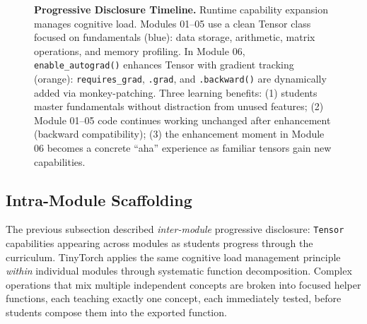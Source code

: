 \documentclass[10pt,twocolumn]{article}
\begin{document}
\begin{figure}[t]
\caption{\textbf{Progressive Disclosure Timeline.} Runtime capability expansion manages cognitive load. Modules 01--05 use a clean Tensor class focused on fundamentals (blue): data storage, arithmetic, matrix operations, and memory profiling. In Module 06, \texttt{enable\_autograd()} enhances Tensor with gradient tracking (orange): \texttt{requires\_grad}, \texttt{.grad}, and \texttt{.backward()} are dynamically added via monkey-patching. Three learning benefits: (1) students master fundamentals without distraction from unused features; (2) Module 01--05 code continues working unchanged after enhancement (backward compatibility); (3) the enhancement moment in Module 06 becomes a concrete ``aha'' experience as familiar tensors gain new capabilities.}
\label{fig:progressive-timeline}
\end{figure}

\subsection{Intra-Module Scaffolding}
\label{subsec:intra-module}

The previous subsection described \emph{inter-module} progressive disclosure: \texttt{Tensor} capabilities appearing across modules as students progress through the curriculum. TinyTorch applies the same cognitive load management principle \emph{within} individual modules through systematic function decomposition. Complex operations that mix multiple independent concepts are broken into focused helper functions, each teaching exactly one concept, each immediately tested, before students compose them into the exported function.
\end{document}
